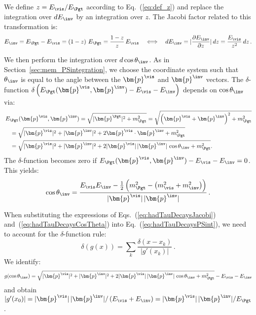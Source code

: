 We define $z = E_{\vis}/E_{\Pgt}$ according to Eq.~(\ref{eq:def_z}) and replace the integration over $dE_{\inv}$ by an integration over $z$.
The Jacobi factor related to this transformation is:
\begin{equation}
E_{\inv} = E_{\Pgt} - E_{\vis} = \left( 1 - z \right)
\, E_{\Pgt} = \frac{1 - z}{z} \, E_{\vis}
  \quad \Longleftrightarrow \quad dE_{\inv} = \lvert \frac{\partial E_{\inv}}{\partial z} \rvert \, dz = \frac{E_{\vis}}{z^{2}} \, dz \, .
\label{eq:hadTauDecaysJacobi}
\end{equation}

We then perform the integration over $d\cos\theta_{\inv}$.
As in Section~\ref{sec:mem_PSintegration}, we choose the coordinate system such that
$\theta_{\inv}$ is equal to the angle between the $\bm{p}^{\vis}$ and $\bm{p}^{\inv}$ vectors.
The $\delta$-function $\delta \left( E_{\Pgt}(\bm{p}^{\vis}, \bm{p}^{\inv}) - E_{\vis} - E_{\inv} \right)$ depends on $\cos\theta_{\inv}$ via:
\begin{align}
& \, E_{\Pgt}(\bm{p}^{\vis}, \bm{p}^{\inv}) 
= \sqrt{\vert\bm{p}^{\Pgt}\vert^{2} + m^{2}_{\Pgt}} = \sqrt{\left( \bm{p}^{\vis} + \bm{p}^{\inv} \right)^2 + m^{2}_{\Pgt}} \nonumber \\
& \quad = \sqrt{\vert\bm{p}^{\vis}\vert^{2} + \vert\bm{p}^{\inv}\vert^{2} + 2 \bm{p}^{\vis}
  \cdot \bm{p}^{\inv} + m^{2}_{\Pgt}} \nonumber \\
& \quad = \sqrt{\vert\bm{p}^{\vis}\vert^{2} + \vert\bm{p}^{\inv}\vert^{2} + 2 \vert\bm{p}^{\vis}\vert \, \vert\bm{p}^{\inv}\vert \, \cos\theta_{\inv} + m^{2}_{\Pgt}}.
\end{align}
The $\delta$-function becomes zero if $E_{\Pgt}(\bm{p}^{\vis}, \bm{p}^{\inv}) - E_{\vis} - E_{\inv} = 0$. 
This yields:
\begin{equation}
\cos\theta_{\inv} 
  = \frac{E_{\vis} E_{\inv} - \frac{1}{2} \left(m^{2}_{\Pgt} - \left(
        m^{2}_{\vis} + m^{2}_{\inv} \right)
    \right)}{\vert\bm{p}^{\vis}\vert \, \vert\bm{p}^{\inv}\vert} \, .
\label{eq:hadTauDecaysCosTheta}
\end{equation}

When substituting the expressions of Eqs.~(\ref{eq:hadTauDecaysJacobi}) and~(\ref{eq:hadTauDecaysCosTheta}) into Eq.~(\ref{eq:hadTauDecaysPSint}),
we need to account for the $\delta$-function rule:
\begin{equation} 
\delta \left( g(x) \right) = \sum_{k} \frac{\delta \left( x - x_{k}
  \right)}{\vert g'(x_{k}) \vert} \, .
\label{eq:deltaFuncRule}
\end{equation}
We identify:
\begin{equation} 
g(\cos\theta_{\inv}) = \sqrt{\vert\bm{p}^{\vis}\vert^{2} + \vert\bm{p}^{\inv}\vert^{2}
  + 2 \vert\bm{p}^{\vis}\vert \, \vert\bm{p}^{\inv}\vert \,
  \cos\theta_{\inv} + m^{2}_{\Pgt}} - E_{\vis} - E_{\inv}
\end{equation}
and obtain $\vert g'(x_{0}) \vert = \vert\bm{p}^{\vis}\vert \,
\vert\bm{p}^{\inv}\vert / \left( E_{\vis} + E_{\inv} \right) = \vert\bm{p}^{\vis}\vert \,
\vert\bm{p}^{\inv}\vert / E_{\Pgt}$.

